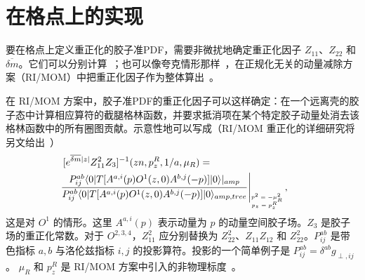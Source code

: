 \section{在格点上的实现}\label{sec:lattice}

要在格点上定义重正化的胶子准PDF，需要非微扰地确定重正化因子 $Z_{11}$、$Z_{22}$ 和 ${\overline {\delta m}}$。它们可以分别计算~\cite{Zhang:2017bzy}；也可以像夸克情形那样~\cite{Stewart:2017tvs,Chen:2017mzz}，在正规化无关的动量减除方案（RI/MOM）中把重正化因子作为整体算出~\cite{Martinelli:1994ty}。

在 RI/MOM 方案中，胶子准PDF的重正化因子可以这样确定：在一个远离壳的胶子态中计算相应算符的截腿格林函数，并要求抵消项在某个特定胶子动量处消去该格林函数中的所有圈图贡献。示意性地可以写成（RI/MOM 重正化的详细研究将另文给出~\cite{Todo:2018glu}）
\begin{align}
&\hspace*{-1.5em}[e^{{\overline{\delta m}}|z|}Z_{11} ^2 Z_3]^{-1}(z n,p^R_z, 1/a, \mu_R)=\non\\
&\hspace*{-2em}\left.\frac{P_{ij}^{ab} \langle 0| T [A^{a,i} (p)  O^{1}(z,0)A^{b,j}(-p) ]|0\rangle|_{amp}}{P_{ij}^{ab} \langle 0|T [A^{a,i} (p)   O^{1}(z,0)A^{b,j} (-p)]|0\rangle_{amp,tree}}\right|_{\tiny\begin{matrix}p^2=-\mu_R^2 \\ \!\!\!\!p_z=p^R_z\end{matrix}},
\end{align}
这是对 $O^1$ 的情形。这里 $A^{a,i}(p)$ 表示动量为 $p$ 的动量空间胶子场。$Z_3$ 是胶子场的重正化常数。对于 $O^{2,3,4}$，$Z_{11} ^2$ 应分别替换为 $Z_{22} ^2$、$Z_{11}Z_{12}$ 和 $Z_{22} ^2$。$P_{ij}^{ab}$ 是带色指标 $a,b$ 与洛伦兹指标 $i,j$ 的投影算符。投影的一个简单例子是 $P_{ij}^{ab}= \delta^{ab}g_{\perp,ij}$。
$\mu_R$ 和 $p_z^R$ 是 RI/MOM 方案中引入的非物理标度~\cite{Stewart:2017tvs,Chen:2017mzz}。

